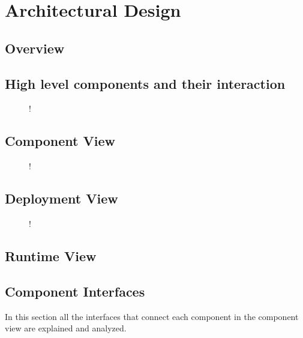 \section{Architectural Design}
\subsection{Overview}
\subsection{High level components and their interaction}
\begin{figure}[H]
	\centering
	\resizebox{6in}
	{!}{}
\end{figure}
\subsection{Component View}
\begin{figure}[H]
	\centering
	\resizebox{6in}
	{!}{}
\end{figure}
\subsection{Deployment View}
\begin{figure}[H]
	\centering
	\resizebox{6in}
	{!}{}
\end{figure}
\subsection{Runtime View}
\subsection{Component Interfaces}
In this section all the interfaces that connect each component in the component view are explained and analyzed.
